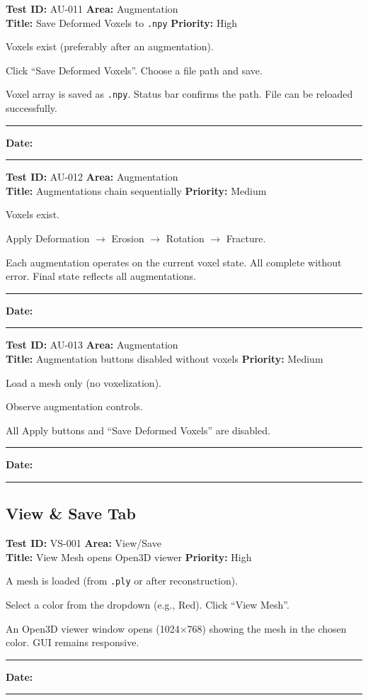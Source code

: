 \documentclass[12pt,a4paper]{article}
\newenvironment{testcase}[4]{%
  \smallskip
  \noindent\textbf{Test ID:} #1 \hfill \textbf{Area:} #2 \\
  \textbf{Title:} #3 \hfill \textbf{Priority:} #4
  \begin{description}[leftmargin=2em,style=nextline]
    \item[\textbf{Preconditions:}]
}{%
    \item[\textbf{Steps:}]
    \item[\textbf{Expected Result:}]
    \item[\textbf{Status:}] \rule{3cm}{0.4pt} \hspace{1em} \textbf{Date:} \rule{3cm}{0.4pt}
    \item[\textbf{Notes:}]
  \end{description}
  \smallskip
}
\begin{document}
\begin{testcase}{AU-011}{Augmentation}{Save Deformed Voxels to \texttt{.npy}}{High}
  \item Voxels exist (preferably after an augmentation).
  \item Click ``Save Deformed Voxels''. Choose a file path and save.
  \item Voxel array is saved as \texttt{.npy}. Status bar confirms the path. File can be reloaded successfully.
\end{testcase}

\begin{testcase}{AU-012}{Augmentation}{Augmentations chain sequentially}{Medium}
  \item Voxels exist.
  \item Apply Deformation $\rightarrow$ Erosion $\rightarrow$ Rotation $\rightarrow$ Fracture.
  \item Each augmentation operates on the current voxel state. All complete without error. Final state reflects all augmentations.
\end{testcase}

\begin{testcase}{AU-013}{Augmentation}{Augmentation buttons disabled without voxels}{Medium}
  \item Load a mesh only (no voxelization).
  \item Observe augmentation controls.
  \item All Apply buttons and ``Save Deformed Voxels'' are disabled.
\end{testcase}

\subsection{View \& Save Tab}

\begin{testcase}{VS-001}{View/Save}{View Mesh opens Open3D viewer}{High}
  \item A mesh is loaded (from \texttt{.ply} or after reconstruction).
  \item Select a color from the dropdown (e.g., Red). Click ``View Mesh''.
  \item An Open3D viewer window opens (1024$\times$768) showing the mesh in the chosen color. GUI remains responsive.
\end{testcase}
\end{document}
